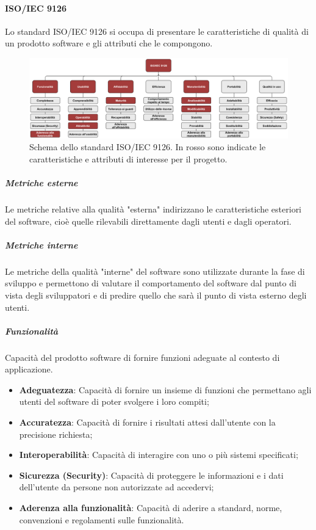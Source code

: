 \paragraph{ISO/IEC 9126}
Lo standard ISO/IEC 9126 si occupa di presentare le caratteristiche di qualità di un prodotto software e gli attributi che le compongono.

\begin{figure}[h]
    \centering
    \includegraphics[scale=0.53]{Immagini/IsoIec9126.png}
    \caption{Schema dello standard ISO/IEC 9126. In rosso sono indicate le caratteristiche e attributi di interesse per il progetto.}
\end{figure}

\subparagraph{Metriche esterne}
Le metriche relative alla qualità "esterna" indirizzano le caratteristiche esteriori del software, cioè quelle rilevabili direttamente dagli utenti e dagli operatori.

\subparagraph{Metriche interne}
Le metriche della qualità "interne" del software sono utilizzate durante la fase di sviluppo e permettono di valutare il comportamento del software dal punto di vista degli sviluppatori e di predire quello che sarà il punto di vista esterno degli utenti.

\subparagraph{Funzionalità}
Capacità del prodotto software di fornire funzioni adeguate al contesto di applicazione.
\begin{itemize}
\item \textbf{Adeguatezza}: Capacità di fornire un insieme di funzioni che permettano agli utenti del software di poter svolgere i loro compiti;
\item \textbf{Accuratezza}: Capacità di fornire i risultati attesi dall’utente con la precisione richiesta;
\item \textbf{Interoperabilità}: Capacità di interagire con uno o più sistemi specificati;
\item \textbf{Sicurezza (Security)}: Capacità di proteggere le informazioni e i dati dell’utente da persone non autorizzate ad accedervi;
\item \textbf{Aderenza alla funzionalità}: Capacità di aderire a standard, norme, convenzioni e regolamenti sulle funzionalità.
\end{itemize}

